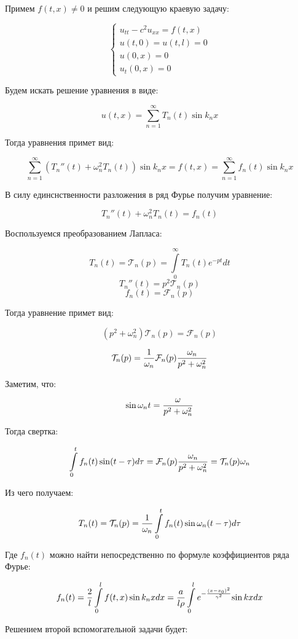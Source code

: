 \documentclass[a4paper]{article}
\begin{document}
Примем $f(t,x)\neq0$ и решим следующую краевую задачу:

$$\left\{
    \begin{aligned}
        u_{tt}-c^2u_{xx}= f(t,x) \\
        u(t,0)=u(t,l)=0   \\
        u(0,x)= 0\\
        u_t(0,x)=0
    \end{aligned}
\right.$$

Будем искать решение уравнения в виде:

$$u(t,x)=\sum\limits_{n=1}^{\infty}T_n(t)\sin k_{n}x$$

Тогда уравнения примет вид:

$$\sum\limits_{n=1}^{\infty}(T_n''(t)+\omega_n^2T_n(t))\sin k_{n}x=f(t,x)=\sum\limits_{n=1}^{\infty}f_n(t)\sin k_{n}x$$

В силу единснственности разложения в ряд Фурье получим уравнение:

$$T_n''(t)+\omega_n^2T_n(t)=f_n(t)$$

Воспользуемся преобразованием Лапласа:

$$
T_n(t) = \mathcal{T}_n(p)=\int\limits_{0}^{\infty}T_n(t)e^{-pt}dt
$$
$$
T_n''(t) = p^2\mathcal{T}_n(p)
$$
$$
f_n(t) = \mathcal{F}_n(p)
$$

Тогда уравнение примет вид:

$$
(p^2+\omega_n^2)\mathcal{T}_n(p) = \mathcal{F}_n(p)
$$

$$
\mathcal{T}_n(p)={1 \over \omega_n}\mathcal{F}_n(p){\omega_n \over p^2+\omega_n^2}
$$

Заметим, что:

$$
\sin\omega_{n}t = {\omega \over p^2+\omega_n^2}
$$

Тогда свертка:

$$
\int\limits_{0}^{t}f_n(t)\sin (t-\tau)d\tau = \mathcal{F}_n(p) {\omega_n \over p^2+\omega_n^2} =\mathcal{T}_n(p) \omega_n
$$

Из чего получаем:

$$
T_n(t) = \mathcal{T}_n(p)={1 \over \omega_n} \int\limits_0^t f_n(t) \sin \omega_n(t-\tau)d\tau
$$

Где $f_n(t)$ можно найти непосредственно по формуле коэффициентов ряда Фурье:

$$
    f_n(t)={2 \over l} \int\limits_0^l f(t,x)\sin k_{n}x dx={a \over {l \rho }}  \int\limits_0^l{e^{-\frac{(x-x_0)^2}{\gamma^2}}{\sin kx} }dx 
$$

Решением второй вспомогательной задачи будет:
\end{document}

